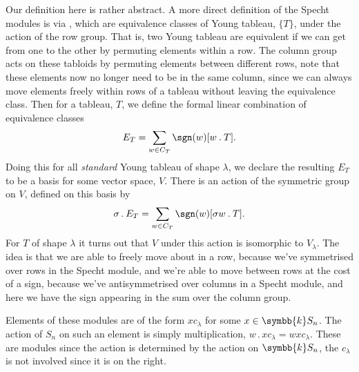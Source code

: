 \documentclass[fleqn]{NotesClass}
\renewcommand{\field}{\symbb{k}}
\newcommand{\action}{\mathbin{.}}
\newcommand{\columnGroup}{C}
\begin{document}
    \begin{remark}{}{}
        Our definition here is rather abstract.
        A more direct definition of the Specht modules is via , which are equivalence classes of Young tableau, \(\{T\}\), under the action of the row group.
        That is, two Young tableau are equivalent if we can get from one to the other by permuting elements within a row.
        The column group acts on these tabloids by permuting elements between different rows, note that these elements now no longer need to be in the same column, since we can always move elements freely within rows of a tableau without leaving the equivalence class.
        Then for a tableau, \(T\), we define the formal linear combination of equivalence classes
        \begin{equation}
            E_T = \sum_{w \in \columnGroup_T} \sgn(w)[w \action T].
        \end{equation}
        Doing this for all \emph{standard} Young tableau of shape \(\lambda\), we declare the resulting \(E_T\) to be a basis for some vector space, \(V\).
        There is an action of the symmetric group on \(V\), defined on this basis by
        \begin{equation}
            \sigma \action E_T = \sum_{w \in \columnGroup_T} \sgn(w)[\sigma w \action T].
        \end{equation}
        For \(T\) of shape \(\lambda\) it turns out that \(V\) under this action is isomorphic to \(V_\lambda\).
        The idea is that we are able to freely move about in a row, because we've symmetrised over rows in the Specht module, and we're able to move between rows at the cost of a sign, because we've antisymmetrised over columns in a Specht module, and here we have the sign appearing in the sum over the column group.
    \end{remark}
    
    Elements of these modules are of the form \(xc_\lambda\) for some \(x \in \field S_n\).
    The action of \(S_n\) on such an element is simply multiplication, \(w \action x c_\lambda = wxc_\lambda\).
    These are modules since the action is determined by the action on \(\field S_n\), the \(c_\lambda\) is not involved since it is on the right.
    
\end{document}

